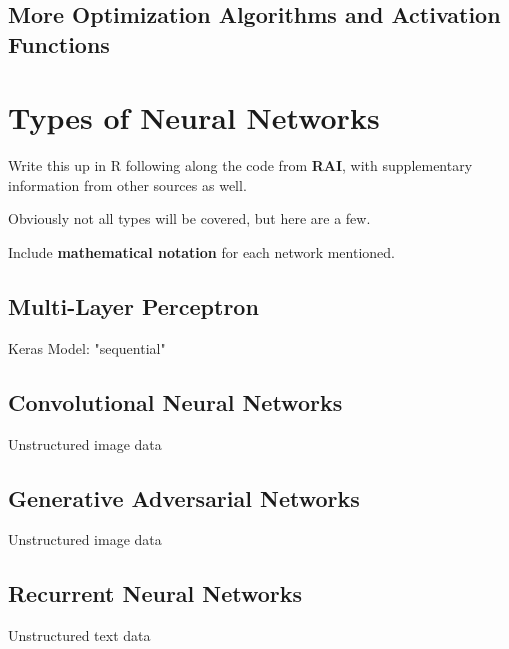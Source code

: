 


\subsection{More Optimization Algorithms and Activation Functions}

\section{Types of Neural Networks} %

Write this up in R following along the code from \textbf{RAI}, with supplementary information from other sources as well.  

Obviously not all types will be covered, but here are a few.  

Include \textbf{mathematical notation} for each network mentioned.

\subsection{Multi-Layer Perceptron}
Keras Model: "sequential"

\subsection{Convolutional Neural Networks}
Unstructured image data

\subsection{Generative Adversarial Networks}
Unstructured image data

\subsection{Recurrent Neural Networks}
Unstructured text data

